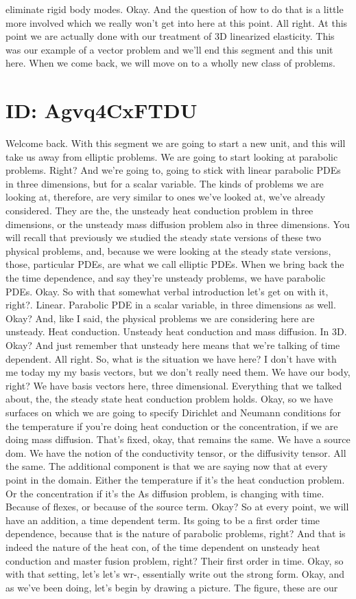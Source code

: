 \documentclass[10pt]{article}
\begin{document}
eliminate rigid body modes. Okay. And the question of how to do that is a little more involved which we really won't get into here at this point. All right. At this point we are actually done with our treatment of 3D linearized elasticity. This was our example of a vector problem and we'll end this segment and this unit here. When we come back, we will move on to a wholly new class of problems.

\section*{ID: Agvq4CxFTDU}
Welcome back. With this segment we are going to start a new unit, and this will take us away from elliptic problems. We are going to start looking at parabolic problems. Right? And we're going to, going to stick with linear parabolic PDEs in three dimensions, but for a scalar variable. The kinds of problems we are looking at, therefore, are very similar to ones we've looked at, we've already considered. They are the, the unsteady heat conduction problem in three dimensions, or the unsteady mass diffusion problem also in three dimensions. You will recall that previously we studied the steady state versions of these two physical problems, and, because we were looking at the steady state versions, those, particular PDEs, are what we call elliptic PDEs. When we bring back the the time dependence, and say they're unsteady problems, we have parabolic PDEs. Okay. So with that somewhat verbal introduction let's get on with it, right?. Linear. Parabolic PDE in a scalar variable, in three dimensions as well.  Okay? And, like I said, the physical problems we are considering here are unsteady. Heat conduction. Unsteady heat conduction and mass diffusion. In 3D. Okay? And just remember that unsteady here means that we're talking of time dependent. All right. So, what is the situation we have here? I don't have with me today my my basis vectors, but we don't really need them. We have our body, right? We have basis vectors here, three dimensional. Everything that we talked about, the, the steady state heat conduction problem holds. Okay, so we have surfaces on which we are going to specify Dirichlet and Neumann conditions for the temperature if you're doing heat conduction or the concentration, if we are doing mass diffusion. That's fixed, okay, that remains the same. We have a source dom. We have the notion of the conductivity tensor, or the diffusivity tensor. All the same. The additional component is that we are saying now that at every point in the domain. Either the temperature if it's the heat conduction problem. Or the concentration if it's the As diffusion problem, is changing with time. Because of flexes, or because of the source term. Okay? So at every point, we will have an addition, a time dependent term. Its going to be a first order time dependence, because that is the nature of parabolic problems, right? And that is indeed the nature of the heat con, of the time dependent on unsteady heat conduction and master fusion problem, right? Their first order in time. Okay, so with that setting, let's let's wr-, essentially write out the strong form. Okay, and as we've been doing, let's begin by drawing a picture. The figure, these are our 
\end{document}
